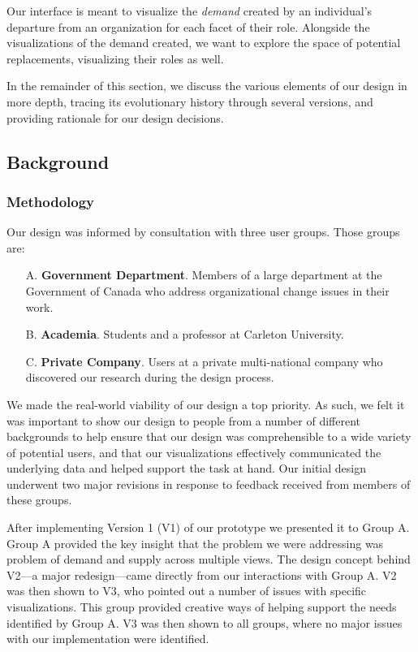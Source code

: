 \documentclass[journal]{vgtc}                %
\begin{document}
Our interface is meant to visualize the \emph{demand} created by an individual's departure from an organization for each facet of their role. Alongside the visualizations of the demand created, we want to explore the space of potential replacements, visualizing their roles as well.

In the remainder of this section, we discuss the various elements of our design in more depth, tracing its evolutionary history through several versions, and providing rationale for our design decisions.

\subsection{Background}


\subsubsection{Methodology}
\label{sec:methodology}


Our design was informed by consultation with three user groups. Those groups are:

\begin{enumerate}[label=(\alph*)]
	\item [A.] \textbf{Government Department}. Members of a large department at the Government of Canada who address organizational change issues in their work.
	\item [B.] \textbf{Academia}. Students and a professor at Carleton University.
	\item [C.] \textbf{Private Company}. Users at a private multi-national company who discovered our research during the design process.
        \end{enumerate}

        We made the real-world viability of our design a top priority. As such, we felt it was important to show our design to people from a number of different backgrounds to help ensure that our design was comprehensible to a wide variety of potential users, and that our visualizations effectively communicated the underlying data and helped support the task at hand. Our initial design underwent two major revisions in response to feedback received from members of these groups. 

After implementing Version 1 (V1) of our prototype we presented it to Group A. Group A provided the key insight that the problem we were addressing was problem of demand and supply across multiple views. The design concept behind V2---a major redesign---came directly from our interactions with Group A. V2 was then shown to V3, who pointed out a number of issues with specific visualizations.  This group provided creative ways of helping support the needs identified by Group A. V3 was then shown to all groups, where no major issues with our implementation were identified.
\end{document}
